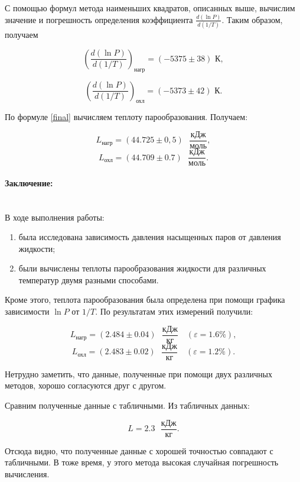 \documentclass[a4paper, 12pt]{article}
\newcommand{\parag}[1]{\paragraph*{#1:}}
\begin{document}
С помощью формул метода наименьших квадратов, описанных выше, вычислим значение и погрешность определения коэффициента $ \displaystyle \frac{d(\ln P)}{d(1/T)} $. Таким образом, получаем

\[ \left(\frac{d(\ln P)}{d(1/T)}\right)_\text{нагр} = \left(-5375\pm38\right)\text{ К}, \]

\[ \left(\frac{d(\ln P)}{d(1/T)}\right)_\text{охл} = \left(-5373\pm42\right)\text{ К}. \]

По формуле \eqref{final} вычисляем теплоту парообразования. Получаем:

\[ L_\text{нагр} = \left(44.725 \pm 0,5\right) \text{ } \frac{\text{кДж}}{\text{моль}}, \]
\[ L_\text{охл} = \left(44.709 \pm 0.7\right) \text{ } \frac{\text{кДж}}{\text{моль}}. \]


\parag {Заключение} ~\\
В ходе выполнения работы:

\begin{enumerate}
	\item была исследована зависимость давления насыщенных паров от давления жидкости;
	\item были вычислены теплоты парообразования жидкости для различных температур двумя разными способами.
\end{enumerate}

Кроме этого, теплота парообразования была определена при помощи графика зависимости $ \ln P $ от $ 1/T $. По результатам этих измерений получили:

\[L_\text{нагр} = \left(2.484 \pm 0.04\right) \text{ } \frac{\text{кДж}}{\text{кг}} \quad (\varepsilon = 1.6 \%), \]
\[ L_\text{охл} = \left(2.483 \pm 0.02\right) \text{ } \frac{\text{кДж}}{\text{кг}} \quad (\varepsilon = 1.2 \%).  \]


Нетрудно заметить, что данные, полученные при помощи двух различных методов, хорошо согласуются друг с другом.

Сравним полученные данные с табличными. Из табличных данных:

\[ L = 2.3 \text{ } \frac{\text{кДж}}{\text{кг}}. \]

Отсюда видно, что полученные данные с хорошей точностью совпадают с табличными. В тоже время, у этого метода высокая случайная погрешность вычисления.
\end{document}
